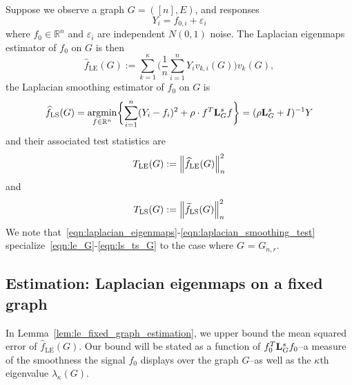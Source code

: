 \documentclass{article}
\newcommand{\Reals}{\mathbb{R}}
\newcommand{\1}{\mathbf{1}}
\DeclareMathOperator*{\argmin}{argmin}
\newcommand{\Lap}{{\bf L}}
\newcommand{\wt}[1]{\widetilde{#1}}
\newcommand{\wh}[1]{\widehat{#1}}
\newcommand{\LE}{\mathrm{LE}}
\newcommand{\LS}{\mathrm{LS}}
\theoremstyle{alden}
\theoremstyle{aldenthm}
\theoremstyle{definition}
\theoremstyle{remark}
\begin{document}
Suppose we observe a graph $G = ([n],E)$, and responses
\begin{equation}
\label{eqn:fixed_graph_regression_model}
Y_i = f_{0,i} + \varepsilon_i
\end{equation}
where $f_0 \in \Reals^n$ and $\varepsilon_i$ are independent $N(0,1)$ noise. The Laplacian eigenmaps estimator of $f_0$ on $G$ is then
\begin{equation}
\label{eqn:le_G}
\wh{f}_{\LE}(G) := \sum_{k = 1}^{\kappa} \biggl(\frac{1}{n}\sum_{i = 1}^{n} Y_i v_{k,i}(G) \biggr) v_k(G),
\end{equation}
the Laplacian smoothing estimator of $f_0$ on $G$ is
\begin{equation}
\label{eqn:ls_G}
\wh{f}_{\LS}(G) = \argmin_{f \in \Reals^n} \biggl\{ \sum_{i = 1}^{n}(Y_i - f_i)^2 + \rho \cdot f^T \Lap_G^{s}  f \biggr\} = (\rho \Lap_G^s + I)^{-1}Y
\end{equation}
and their associated test statistics are
\begin{equation}
\label{eqn:le_ts_G}
T_{\LE}(G) := \Bigl\|\wh{f}_{\LE}(G)\Bigr\|_n^2
\end{equation}
and
\begin{equation}
\label{eqn:ls_ts_G}
T_{\LS}(G) := \Bigl\|\wt{f}_{\LS}(G)\Bigr\|_n^2
\end{equation}
We note that~\eqref{eqn:laplacian_eigenmaps}-\eqref{eqn:laplacian_smoothing_test} specialize~\eqref{eqn:le_G}-\eqref{eqn:ls_ts_G} to the case where $G$ = $G_{n,r}$.

\subsection{Estimation: Laplacian eigenmaps on a fixed graph}


In Lemma~\ref{lem:le_fixed_graph_estimation}, we upper bound the mean squared error of $\wh{f}_{\LE}(G)$. Our bound will be stated as a function of $f_0^T \Lap_G^s f_0$--a measure of the smoothness the signal $f_0$ displays over the graph $G$--as well as the $\kappa$th eigenvalue $\lambda_{\kappa}(G)$.
\end{document}
